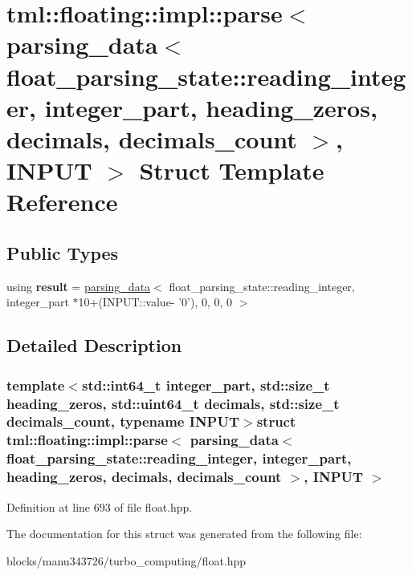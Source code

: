 \hypertarget{structtml_1_1floating_1_1impl_1_1parse_3_01parsing__data_3_01float__parsing__state_1_1reading__i1aa02129d9cba7c61d2a15640ae2b3db}{\section{tml\+:\+:floating\+:\+:impl\+:\+:parse$<$ parsing\+\_\+data$<$ float\+\_\+parsing\+\_\+state\+:\+:reading\+\_\+integer, integer\+\_\+part, heading\+\_\+zeros, decimals, decimals\+\_\+count $>$, I\+N\+P\+U\+T $>$ Struct Template Reference}
\label{structtml_1_1floating_1_1impl_1_1parse_3_01parsing__data_3_01float__parsing__state_1_1reading__i1aa02129d9cba7c61d2a15640ae2b3db}
}
\subsection*{Public Types}
\begin{DoxyCompactItemize}
\item 
\hypertarget{structtml_1_1floating_1_1impl_1_1parse_3_01parsing__data_3_01float__parsing__state_1_1reading__i1aa02129d9cba7c61d2a15640ae2b3db_a0f85854e28b9be7318cc1f824e261f50}{using {\bfseries result} = \hyperlink{structtml_1_1floating_1_1impl_1_1parsing__data}{parsing\+\_\+data}$<$ float\+\_\+parsing\+\_\+state\+::reading\+\_\+integer, integer\+\_\+part $\ast$10+(I\+N\+P\+U\+T\+::value-\/ '0'), 0, 0, 0 $>$}\label{structtml_1_1floating_1_1impl_1_1parse_3_01parsing__data_3_01float__parsing__state_1_1reading__i1aa02129d9cba7c61d2a15640ae2b3db_a0f85854e28b9be7318cc1f824e261f50}

\end{DoxyCompactItemize}


\subsection{Detailed Description}
\subsubsection*{template$<$std\+::int64\+\_\+t integer\+\_\+part, std\+::size\+\_\+t heading\+\_\+zeros, std\+::uint64\+\_\+t decimals, std\+::size\+\_\+t decimals\+\_\+count, typename I\+N\+P\+U\+T$>$struct tml\+::floating\+::impl\+::parse$<$ parsing\+\_\+data$<$ float\+\_\+parsing\+\_\+state\+::reading\+\_\+integer, integer\+\_\+part, heading\+\_\+zeros, decimals, decimals\+\_\+count $>$, I\+N\+P\+U\+T $>$}



Definition at line 693 of file float.\+hpp.



The documentation for this struct was generated from the following file\+:\begin{DoxyCompactItemize}
\item 
blocks/manu343726/turbo\+\_\+computing/float.\+hpp\end{DoxyCompactItemize}
